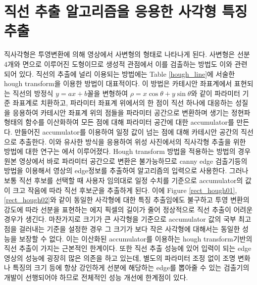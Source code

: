 \documentclass[master,korean,final]{cbnu-ecs}
\begin{document}
\section{직선 추출 알고리즘을 응용한 사각형 특징 추출}
직사각형은 투영변환에 의해 영상에서 사변형의 형태로 나타나게 된다. 사변형은 선분 4개와 면으로 이루어진 도형이므로 생성적 관점에서 이를 검출하는 방법도 이와 관련되어 있다. 직선의 추출에 널리 이용되는 방법에는 Table \ref{hough_line}에 서술한 hough transform을 이용한 방법이 대표적이다. 이 방법은 카테시안 좌표계에서 표현되는 직선의 방정식 $y=ax+b$꼴을 변형하여 $\rho=x\cos\theta+y\sin\theta$와 같이 파라미터 기준 좌표계로 치환하고, 파라미터 좌표계 위에서의 한 점이 직선 하나에 대응하는 성질을 응용하여 카테시안 좌표계 위의 점들을 파라미터 공간으로 변환하며 생기는 정현파 형태의 함수를 이산화하여 모든 점에 대해 파라미터 공간에 대한 accumulator를 만든다. 만들어진 accumulator를 이용하여 일정 값이 넘는 점에 대해 카테시안 공간의 직선으로 추출한다. 이와 유사한 방식을 응용하여 위성 사진에서의 직사각형 추출을 위한 방법에 대한 연구는 \cite{Jung2004}에서 이루어졌다.
Hough transform 방법을 적용하는 방법의 경우 원본 영상에서 바로 파라미터 공간으로 변환은 불가능하므로 canny edge 검출기등의 방법을 이용해서 영상의 edge정보를 추출하여 알고리즘의 입력으로 사용한다. 그러나 보통 직선 후보를 선택할 때 사용자 임의대로 일정 수치를 기준으로 accumulator의 값이 크고 작음에 따라 직선 후보군을 추출하게 된다. 이에 Figure \ref{rect_hough01}, \ref{rect_hough02}와 같이 동일한 사각형에 대한 특징 추출임에도 불구하고 투영 변환의 강도에 따라 선분을 표현하는 에지 픽셀의 길이가 줄어 정상적으로 직선 추출이 어려운 경우가 생긴다. 마찬가지로 크기가 큰 사각형을 기준으로 accumulator 값의 국부 최고점을 걸러내는 기준을 설정한 경우 그 크기가 보다 작은 사각형에 대해서는 동일한 성능을 보장할 수 없다. 이는 이산화된 accumulator를 이용하는 hough transform기반의 직선 추출이 가지는 근본적인 한계이다. 또한 직선 추출 성능에 있어 입력이 되는 edge 영상의 성능에 굉장히 많은 의존을 하고 있는데, 별도의 파라미터 조정 없이 조명 변화나 특징의 크기 등에 항상 강인하게 선분에 해당하는 edge를 뽑아줄 수 있는 검출기의 개발이 선행되어야 하므로 전체적인 성능 개선에 한계점이 있다. 
\end{document}
